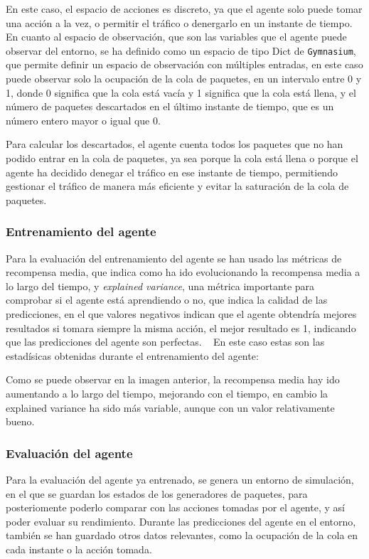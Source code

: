En este caso, el espacio de acciones es discreto, ya que el agente solo puede tomar una acción a la vez, o permitir el tráfico o denergarlo en un instante de tiempo. En cuanto al espacio de observación, que son las variables que el agente puede observar del entorno, se ha definido como un espacio de tipo Dict de \texttt{Gymnasium}, que permite definir un espacio de observación con múltiples entradas, en este caso puede observar solo la ocupación de la cola de paquetes, en un intervalo entre 0 y 1, donde 0 significa que la cola está vacía y 1 significa que la cola está llena, y el número de paquetes descartados en el último instante de tiempo, que es un número entero mayor o igual que 0.

Para calcular los descartados, el agente cuenta todos los paquetes que no han podido entrar en la cola de paquetes, ya sea porque la cola está llena o porque el agente ha decidido denegar el tráfico en ese instante de tiempo, permitiendo gestionar el tráfico de manera más eficiente y evitar la saturación de la cola de paquetes.

\subsubsection{Entrenamiento del agente}
Para la evaluación del entrenamiento del agente se han usado las métricas de recompensa media, que indica como ha ido evolucionando la recompensa media a lo largo del tiempo, y \textit{explained variance}, una métrica importante para comprobar si el agente está aprendiendo o no, que indica la calidad de las predicciones, en el que valores negativos indican que el agente obtendría mejores resultados si tomara siempre la misma acción, el mejor resultado es 1, indicando que las predicciones del agente son perfectas. ~\cite{JonathanHui2023}
En este caso estas son las estadísicas obtenidas durante el entrenamiento del agente:


Como se puede observar en la imagen anterior, la recompensa media hay ido aumentando a lo largo del tiempo, mejorando con el tiempo, en cambio la explained variance ha sido más variable, aunque con un valor relativamente bueno.

\subsubsection{Evaluación del agente}
Para la evaluación del agente ya entrenado, se genera un entorno de simulación, en el que se guardan los estados de los generadores de paquetes, para posteriomente poderlo comparar con las acciones tomadas por el agente, y así poder evaluar su rendimiento.
Durante las predicciones del agente en el entorno, también se han guardado otros datos relevantes, como la ocupación de la cola en cada instante o la acción tomada.

